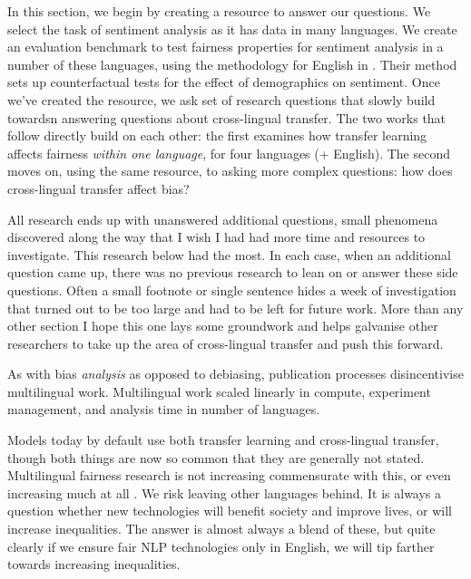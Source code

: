 In this section, we begin by creating a resource to answer our questions. We select the task of sentiment analysis as it has data in many languages. We create an evaluation benchmark to test fairness properties for sentiment analysis in a number of these languages, using the methodology for English in \citet{kiritchenko-mohammad-2018-examining}. Their method sets up counterfactual tests for the effect of demographics on sentiment.  Once we've created the resource, we ask set of research questions that slowly build towardsn answering questions about cross-lingual transfer. The two works that follow directly build on each other: the first examines how transfer learning affects fairness \textit{within one language}, for four languages (+ English). The second moves on, using the same resource, to asking more complex questions: how does cross-lingual transfer affect bias? 

All research ends up with unanswered additional questions, small phenomena discovered along the way that I wish I had had more time and resources to investigate. This research below had the most. In each case, when an additional question came up, there was no previous research to lean on or answer these side questions. Often a small footnote or single sentence hides a week of investigation that turned out to be too large and had to be left for future work. More than any other section I hope this one lays some groundwork and helps galvanise other researchers to take up the area of cross-lingual transfer and push this forward. 

As with bias \textit{analysis} as opposed to debiasing, publication processes disincentivise multilingual work. Multilingual work scaled linearly in compute, experiment management, and analysis time in number of languages.

Models today by default use both transfer learning and cross-lingual transfer, though both things are now so common that they are generally not stated. Multilingual fairness research is not increasing commensurate with this, or even increasing much at all \citep{ruder-etal-2022-square, blasi-etal-2022-systematic}. We risk leaving other languages behind. It is always a question whether new technologies will benefit society and improve lives, or will increase inequalities. The answer is almost always a blend of these, but quite clearly if we ensure fair NLP technologies only in English, we will tip farther towards increasing inequalities. 
